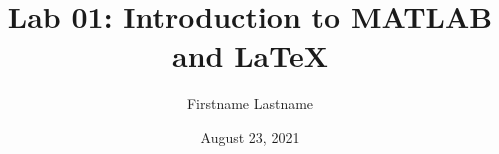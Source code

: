 \newcommand{\course}{MATH 3341}
\title{Lab 01: Introduction to MATLAB and \LaTeX{}}
\author{Firstname Lastname}
\date{August 23, 2021}

